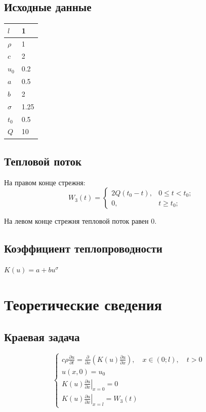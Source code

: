 \documentclass[a4paper,12pt]{article}
\begin{document}
\subsection{Исходные данные}

    \begin{tabular}{|C|M|}
        \hline
         \(l\) & 1 \\ \hline
         \(\rho\) & 1 \\ \hline
         \(c\) & 2 \\ \hline
         \(u_0\) & 0.2 \\ \hline
         \(a\) & 0.5 \\ \hline
         \(b\) & 2 \\ \hline
         \(\sigma\) & 1.25 \\ \hline
         \(t_0\) & 0.5 \\ \hline
         \(Q\) & 10 \\ \hline
    \end{tabular}

\subsection{Тепловой поток}
На правом конце стрежня:
$$W_3(t)=\left\{\begin{array}{lll} 2Q(t_0-t),&0\le t < t_0; \\ 0,&t\ge t_0; \end{array}\right.$$

На левом конце стрежня тепловой поток равен 0.

\subsection{Коэффициент теплопроводности}
 \(K(u) = a + bu^\sigma\)

\newpage
\section{Теоретические сведения}
\subsection{Краевая задача}

\begin{displaymath}
\left \{ 
\begin{array}{ll}
c\rho \frac{\partial u}{\partial t} = \frac{\partial }{\partial x}\left(K(u)\frac{\partial u}{\partial x}\right),\quad x \in (0;l), \quad t > 0
 & \\
u(x,0) = u_0 & \\
\left.K(u)\frac{\partial u}{\partial x}\right |_{x=0} = 0 \\
\left.K(u)\frac{\partial u}{\partial x}\right |_{x=l} = W_3(t)
\end{array} 
\right.
\end{displaymath}
\end{document}
